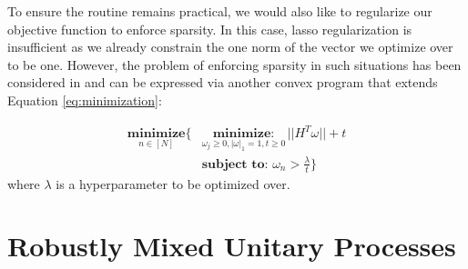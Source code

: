 \documentclass[aps,nofootinbib,pra,notitlepage,twocolumn]{revtex4-1}
\begin{document}

To ensure the routine remains practical, we would also like to regularize our objective function to enforce sparsity. In this case, lasso regularization \cite{tibshirani1996regression} is insufficient as we already constrain the one norm of the vector we optimize over to be one. However, the problem of enforcing sparsity in such situations has been considered in \cite{NIPS2012_4504} and can be expressed via another convex program that extends Equation \ref{eq:minimization}:

\begin{equation}\label{eq:minimization_regularization}
\begin{split}
\underset{n\in[N]}{\textbf{minimize}}\{
    &\underset{\omega_j\geq0, |\omega|_1=1, t\geq0}{\textbf{minimize}: } ||H^T\omega|| + t\\
    &\textbf{subject to: } \omega_n > \frac{\lambda}{t}\}
\end{split}
\end{equation} where $\lambda$ is a hyperparameter to be optimized over.



\section{Robustly Mixed Unitary Processes}
\label{sec:robustly_mixed}
\end{document}
